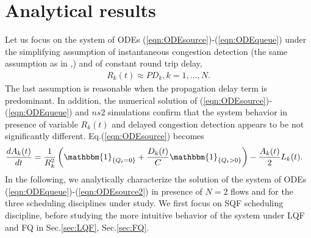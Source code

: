\documentclass[a4paper,oneside, 11pt]{article}
\newcommand{\I}[1]{  \mathbbm{1}_{ \left\{  #1 \right\} }   }
\begin{document}
\section{Analytical results}\label{sec:Analytical-results}
\vspace{-1mm}
Let us focus on the system of ODEs  (\ref{eqn:ODEsource})-(\ref{eqn:ODEqueue}) under the simplifying
assumption of instantaneous congestion detection
(the same assumption as in \cite{baccelli},\cite{carofiglioSplit}) and of constant round trip delay,
\begin{align}\label{eq:R}
R_k(t) \approx PD_k, k=1,\dots,N.
\end{align}
The last assumption is reasonable when the propagation delay term is predominant.
In addition, the numerical solution of (\ref{eqn:ODEsource})-(\ref{eqn:ODEqueue}) and
$ns2$ simulations confirm that the system behavior in presence of variable $R_k(t)$ and
delayed congestion detection appears to be not significantly different.
Eq.(\ref{eqn:ODEsource}) becomes\begin{align}\label{eqn:ODEsource2}
&\frac{dA_k(t)}{dt} =\frac{1}{R^2_k} \left(\I{Q_t=0}+\frac{D_k(t)}{C}\I{Q_t>0}\right)-\frac{A_k(t)}{2}L_k(t).
\end{align}
In the following, we analytically characterize the solution of the system of ODEs
(\ref{eqn:ODEqueue})-(\ref{eqn:ODEsource2}) in presence of $N=2$ flows and
for the three scheduling disciplines under study. We first focus on SQF scheduling
discipline, before
studying the more intuitive behavior of the system under LQF and FQ in Sec.\ref{sec:LQF}, Sec.\ref{sec:FQ}.
\end{document}

